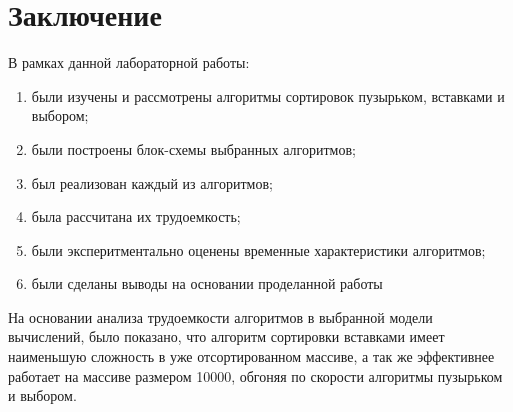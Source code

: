 \documentclass[12pt]{report}
\begin{document}
	\chapter*{Заключение}
	
	В рамках данной лабораторной работы:
	
	\begin{enumerate}
		\item были изучены и рассмотрены алгоритмы сортировок пузырьком, вставками и выбором;
		\item были построены блок-схемы выбранных алгоритмов;
		\item был реализован каждый из алгоритмов;
		\item была рассчитана их трудоемкость;
		\item были эксперитментально оценены временные характеристики алгоритмов;
		\item были сделаны выводы на основании проделанной работы
	\end{enumerate}
	
	На основании анализа трудоемкости алгоритмов в выбранной модели вычислений, было показано, что алгоритм сортировки вставками имеет наименьшую сложность в уже отсортированном массиве, а так же эффективнее работает на массиве размером 10000, обгоняя по скорости алгоритмы пузырьком и выбором.
	
	
	
%	
	
\end{document}
